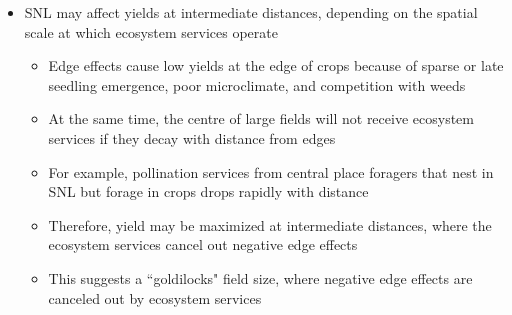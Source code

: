 \documentclass[]{elsarticle} %
\providecommand{\tightlist}{%
  \setlength{\itemsep}{0pt}\setlength{\parskip}{0pt}}
\begin{document}
\begin{itemize}
\tightlist
\item
  SNL may affect yields at intermediate distances, depending on the spatial scale at which ecosystem services operate

  \begin{itemize}
  \tightlist
  \item
    Edge effects cause low yields at the edge of crops because of sparse or late seedling emergence, poor microclimate, and competition with weeds
  \item
    At the same time, the centre of large fields will not receive ecosystem services if they decay with distance from edges
  \item
    For example, pollination services from central place foragers that nest in SNL but forage in crops drops rapidly with distance
  \item
    Therefore, yield may be maximized at intermediate distances, where the ecosystem services cancel out negative edge effects
  \item
    This suggests a ``goldilocks" field size, where negative edge effects are canceled out by ecosystem services
  \end{itemize}
\end{itemize}
\end{document}
